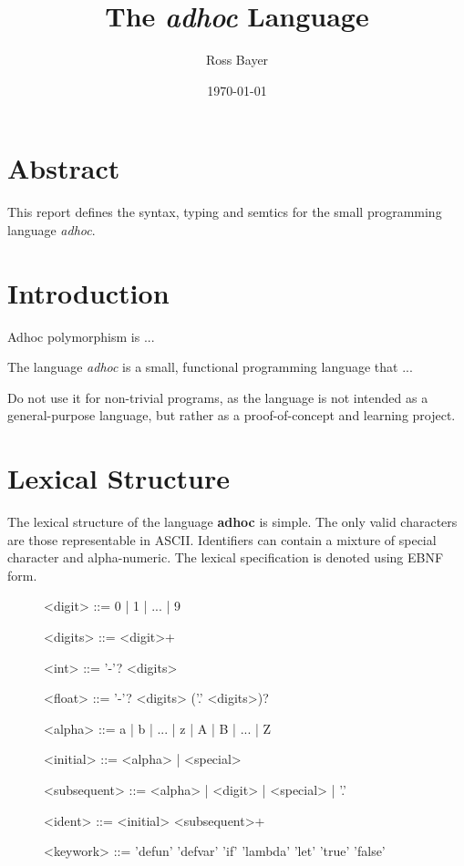 \documentclass[10pt,a4paper,fleqn]{article}
\title{The \textit{adhoc} Language}
\author{Ross Bayer}
\date{\today}
\begin{document}
\maketitle



\section*{Abstract}

This report defines the syntax, typing and semtics for the small programming
language \textit{adhoc}.



\section{Introduction}

Adhoc polymorphism is ...

The language \textit{adhoc} is a small, functional programming language that ...

Do not use it for non-trivial programs, as the language is not intended as a
general-purpose language, but rather as a proof-of-concept and learning
project.



\section{Lexical Structure}

The lexical structure of the language \textbf{adhoc} is simple. The only
valid characters are those representable in ASCII. Identifiers can contain
a mixture of special character and alpha-numeric. The lexical specification
is denoted using EBNF form.


\begin{figure}[H]
\renewcommand{\grammarlabel}[2]{\synt{#1}\hfill#2}
\setlength{\grammarindent}{8em}
\begin{grammar}
<digit> ::= 0 | 1 | ... | 9

<digits> ::= <digit>+

<int> ::= '-'? <digits>

<float> ::= '-'? <digits> ('.' <digits>)?

<alpha> ::= a | b | ... | z | A | B | ... | Z

<initial> ::= <alpha> | <special>

<subsequent> ::= <alpha> | <digit> | <special> | '.'

<ident> ::= <initial> <subsequent>+

<keywork> ::= 'defun'
    \alt 'defvar'
    \alt 'if'
    \alt 'lambda'
    \alt 'let'
    \alt 'true'
    \alt 'false'

\end{grammar}
\end{figure}
\end{document}
